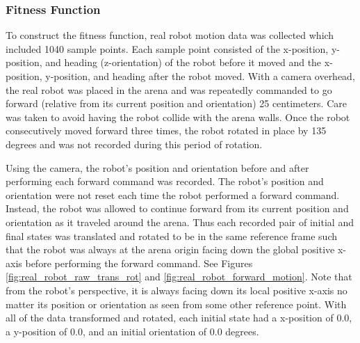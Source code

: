 \subsubsection{Fitness Function}


To construct the fitness function, real robot motion data was collected which included 1040 sample points. Each sample point consisted of the x-position, y-position, and heading (z-orientation) of the robot before it moved and the x-position, y-position, and heading after the robot moved. With a camera overhead, the real robot was placed in the arena and was repeatedly commanded to go forward (relative from its current position and orientation) 25 centimeters. Care was taken to avoid having the robot collide with the arena walls. Once the robot consecutively moved forward three times, the robot rotated in place by 135 degrees and was not recorded during this period of rotation.  

Using the camera, the robot's position and orientation before and after performing each forward command was recorded. The robot's position and orientation were not reset each time the robot performed a forward command. Instead, the robot was allowed to continue forward from its current position and orientation as it traveled around the arena. Thus each recorded pair of initial and final states was translated and rotated to be in the same reference frame such that the robot was always at the arena origin facing down the global positive x-axis before performing the forward command. See Figures \ref{fig:real_robot_raw_trans_rot} and \ref{fig:real_robot_forward_motion}. Note that from the robot's perspective, it is always facing down its local positive x-axis no matter its position or orientation as seen from some other reference point. With all of the data transformed and rotated, each initial state had a x-position of 0.0, a y-position of 0.0, and an initial orientation of 0.0 degrees. 

